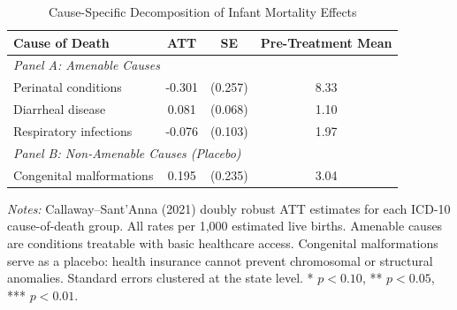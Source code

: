 \begin{table}[H]
\centering
\caption{Cause-Specific Decomposition of Infant Mortality Effects}
\label{tab:causes}
\begin{threeparttable}
\begin{tabular}{lccc}
\toprule
Cause of Death & ATT & SE & Pre-Treatment Mean \\
\midrule
\multicolumn{4}{l}{\textit{Panel A: Amenable Causes}} \\
Perinatal conditions & -0.301 & (0.257) & 8.33 \\
Diarrheal disease & 0.081 & (0.068) & 1.10 \\
Respiratory infections & -0.076 & (0.103) & 1.97 \\
\midrule
\multicolumn{4}{l}{\textit{Panel B: Non-Amenable Causes (Placebo)}} \\
Congenital malformations & 0.195 & (0.235) & 3.04 \\
\bottomrule
\end{tabular}
\begin{tablenotes}[flushleft]
\small
\item \textit{Notes:} Callaway--Sant'Anna (2021) doubly robust ATT estimates for each ICD-10 cause-of-death group. All rates per 1,000 estimated live births. Amenable causes are conditions treatable with basic healthcare access. Congenital malformations serve as a placebo: health insurance cannot prevent chromosomal or structural anomalies. Standard errors clustered at the state level. * $p<0.10$, ** $p<0.05$, *** $p<0.01$.
\end{tablenotes}
\end{threeparttable}
\end{table}
